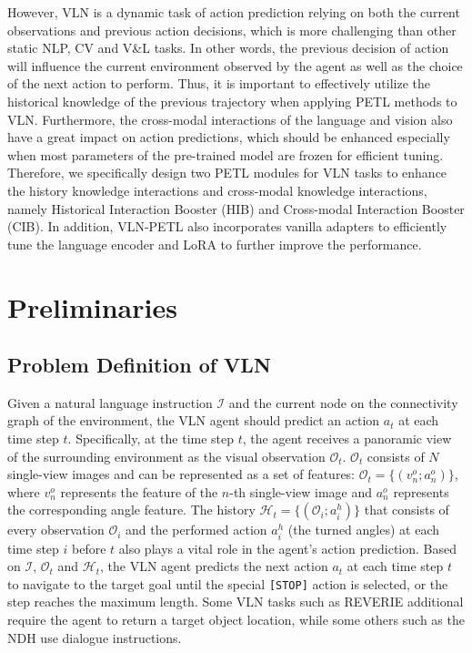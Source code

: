 \documentclass[10pt,twocolumn,letterpaper]{article}
\begin{document}
However, VLN is a dynamic task of action prediction relying on both the current observations and previous action decisions, which is more challenging than other static NLP, CV and V\&L tasks. In other words, the previous decision of action will influence the current environment observed by the agent as well as the choice of the next action to perform. Thus, it is important to effectively utilize the historical knowledge of the previous trajectory when applying PETL methods to VLN. Furthermore, the cross-modal interactions of the language and vision also have a great impact on action predictions, which should be enhanced especially when most parameters of the pre-trained model are frozen for efficient tuning. Therefore, we specifically design two PETL modules for VLN tasks to enhance the history knowledge interactions and cross-modal knowledge interactions, namely Historical Interaction Booster (HIB) and Cross-modal Interaction Booster (CIB). In addition, VLN-PETL also incorporates vanilla adapters to efficiently tune the language encoder and LoRA to further improve the performance.






 \vspace{-5pt}
\section{Preliminaries}
\label{sec:methods}


\subsection{Problem Definition of VLN}
\vspace{-3pt}
Given a natural language instruction $\mathcal{I}$
and the current node on the connectivity graph of the environment, the VLN agent should predict an action $a_t$ at each time step $t$.
Specifically, at the time step $t$, the agent receives a panoramic view of the surrounding environment as the visual observation $\mathcal{O}_t$. $\mathcal{O}_t$ consists of $N$ single-view images and can be represented as a set of features: 
$\mathcal{O}_t=\{(v_n^o;a_n^o)\}$, where $v_n^o$ represents the feature of the $n$-th single-view image and $a_n^o$ represents the corresponding angle feature. The history $\mathcal{H}_t =\{(\mathcal{O}_i;a_i^h)\}$ that consists of every observation $\mathcal{O}_i$ and the performed action $a_i^h$ (\ie the turned angles) at each time step $i$ before $t$ also plays a vital role in the agent's action prediction.
Based on $\mathcal{I}$, $\mathcal{O}_t$ and $\mathcal{H}_t$, the VLN agent predicts the next action $a_t$ at each time step $t$ to navigate to the target goal until the special \texttt{[STOP]} action is selected, or the step reaches the maximum length. Some VLN tasks such as REVERIE \cite{reverie} additional require the agent to return a target object location, while some others such as the NDH \cite{ndh} use dialogue instructions.
\end{document}
